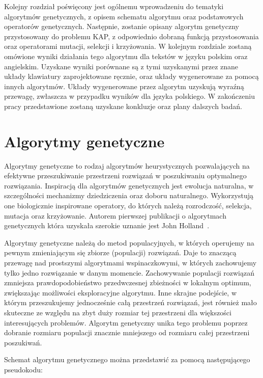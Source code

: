 \documentclass{xmgr}
\begin{document}
Kolejny rozdział poświęcony jest ogólnemu wprowadzeniu do tematyki algorytmów genetycznych, z opisem schematu algorytmu oraz podstawowych operatorów genetycznych. Następnie, zostanie opisany algorytm genetyczny przystosowany do problemu KAP, z odpowiednio dobraną funkcją przystosowania oraz operatorami mutacji, selekcji i krzyżowania. W kolejnym rozdziale zostaną omówione wyniki działania tego algorytmu dla tekstów w języku polskim oraz angielskim. Uzyskane wyniki porównane są z tymi uzyskanymi przez znane układy klawiatury zaprojektowane ręcznie, oraz układy wygenerowane za pomocą innych algorytmów. Układy wygenerowane przez algorytm uzyskują wyraźną przewagę, zwłaszcza w przypadku wyników dla języka polskiego. W zakończeniu pracy przedstawione zostaną uzyskane konkluzje oraz plany dalszych badań.


\chapter{Algorytmy genetyczne}

Algorytmy genetyczne to rodzaj algorytmów heurystycznych pozwalających na efektywne przeszukiwanie przestrzeni rozwiązań w poszukiwaniu optymalnego rozwiązania. Inspiracją dla algorytmów genetycznych jest ewolucja naturalna, w szczególności mechanizmy dziedziczenia oraz doboru naturalnego. Wykorzystują one biologicznie inspirowane operatory, do których należą rozrodczość, selekcja, mutacja oraz krzyżowanie. Autorem pierwszej publikacji o algorytmach genetycznych która uzyskała szerokie uznanie jest John Holland~\cite{Holland1975}.

Algorytmy genetyczne należą do metod populacyjnych, w których operujemy na pewnym zmieniającym się zbiorze (populacji) rozwiązań. Daje to znaczącą przewagę nad prostszymi algorytmami wspinaczkowymi, w których zachowujemy tylko jedno rozwiązanie w danym momencie. Zachowywanie populacji rozwiązań zmniejsza prawdopodobieństwo przedwczesnej zbieżności w lokalnym optimum, zwiększając możliwości eksploracyjne algorytmu. Inne skrajne podejście, w którym przeszukujemy jednocześnie całą przestrzeń rozwiązań, jest również mało skuteczne ze względu na zbyt duży rozmiar tej przestrzeni dla większości interesujących problemów. Algorytm genetyczny unika tego problemu poprzez dobranie rozmiaru populacji znacznie mniejszego od rozmiaru całej przestrzeni poszukiwań.

Schemat algorytmu genetycznego można przedstawić za pomocą następującego pseudokodu:
\end{document}
